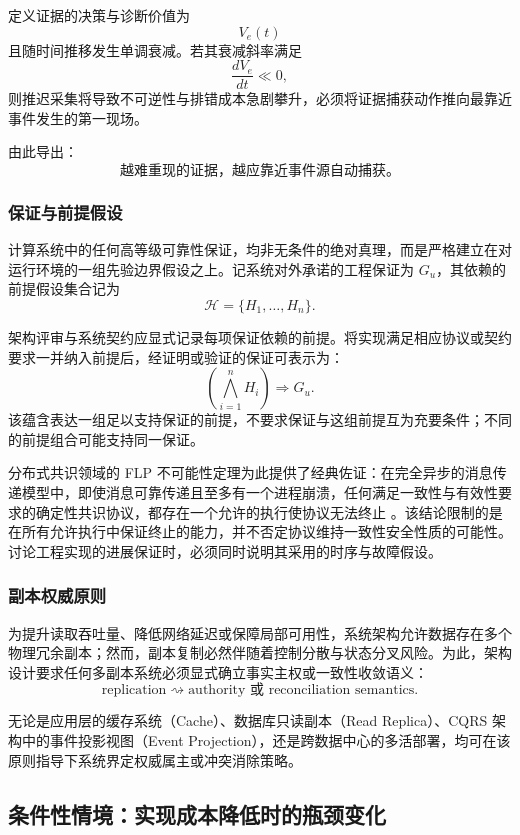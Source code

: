 \documentclass[11pt,a4paper]{ctexart}
\numberwithin{equation}{section}
\theoremstyle{definition}
\theoremstyle{plain}
\begin{document}
定义证据的决策与诊断价值为
\[
V_e(t)
\]
且随时间推移发生单调衰减。若其衰减斜率满足
\[
\frac{dV_e}{dt}\ll 0,
\]
则推迟采集将导致不可逆性与排错成本急剧攀升，必须将证据捕获动作推向最靠近事件发生的第一现场。

由此导出：
\[
\boxed{
\text{越难重现的证据，越应靠近事件源自动捕获。}
}
\]

\subsubsection{保证与前提假设}

计算系统中的任何高等级可靠性保证，均非无条件的绝对真理，而是严格建立在对运行环境的一组先验边界假设之上。记系统对外承诺的工程保证为 $G_u$，其依赖的前提假设集合记为
\[
\mathcal{H}=\{H_1,\ldots,H_n\}.
\]

架构评审与系统契约应显式记录每项保证依赖的前提。将实现满足相应协议或契约要求一并纳入前提后，经证明或验证的保证可表示为：
\[
\boxed{
\left(\bigwedge_{i=1}^{n}H_i\right)\Longrightarrow G_u.
}
\]
该蕴含表达一组足以支持保证的前提，不要求保证与这组前提互为充要条件；不同的前提组合可能支持同一保证。

分布式共识领域的 FLP 不可能性定理为此提供了经典佐证：在完全异步的消息传递模型中，即使消息可靠传递且至多有一个进程崩溃，任何满足一致性与有效性要求的确定性共识协议，都存在一个允许的执行使协议无法终止 \cite{flp1985}。该结论限制的是在所有允许执行中保证终止的能力，并不否定协议维持一致性安全性质的可能性。讨论工程实现的进展保证时，必须同时说明其采用的时序与故障假设。

\subsubsection{副本权威原则}

为提升读取吞吐量、降低网络延迟或保障局部可用性，系统架构允许数据存在多个物理冗余副本；然而，副本复制必然伴随着控制分散与状态分叉风险。为此，架构设计要求任何多副本系统必须显式确立事实主权或一致性收敛语义：
\[
\boxed{
\text{replication}
\rightsquigarrow
\text{authority 或 reconciliation semantics}.
}
\]

无论是应用层的缓存系统（Cache）、数据库只读副本（Read Replica）、CQRS 架构中的事件投影视图（Event Projection），还是跨数据中心的多活部署，均可在该原则指导下系统界定权威属主或冲突消除策略。

\subsection{条件性情境：实现成本降低时的瓶颈变化}
\end{document}
